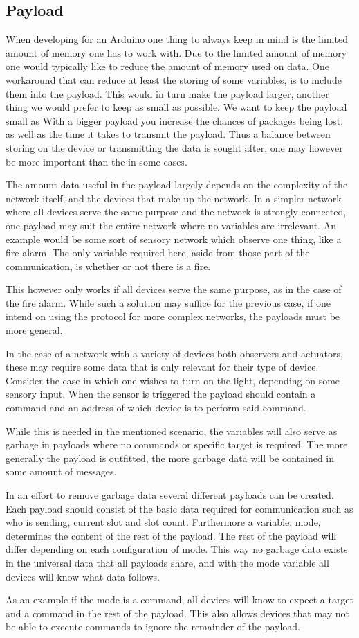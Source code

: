 \subsection{Payload}
When developing for an Arduino one thing to always keep in mind is the limited amount of memory one has to work with.
Due to the limited amount of memory one would typically like to reduce the amount of memory used on data.
One workaround that can reduce at least the storing of some variables, is to include them into the payload.
This would in turn make the payload larger, another thing we would prefer to keep as small as possible.
We want to keep the payload small as With a bigger payload you increase the chances of packages being lost, as well as the time it takes to transmit the payload. 
Thus a balance between storing on the device or transmitting the data is sought after, one may however be more important than the in some cases.

\bigskip \noindent
The amount data useful in the payload largely depends on the complexity of the network itself, and the devices that make up the network.
In a simpler network where all devices serve the same purpose and the network is strongly connected, one payload may suit the entire network where no variables are irrelevant.
An example would be some sort of sensory network which observe one thing, like a fire alarm.
The only variable required here, aside from those part of the communication, is whether or not there is a fire.

This however only works if all devices serve the same purpose, as in the case of the fire alarm.
While such a solution may suffice for the previous case, if one intend on using the protocol for more complex networks, the payloads must be more general.

\bigskip \noindent
In the case of a network with a variety of devices both observers and actuators, these may require some data that is only relevant for their type of device.
Consider the case in which one wishes to turn on the light, depending on some sensory input.
When the sensor is triggered the payload should contain a command and an address of which device is to perform said command.

While this is needed in the mentioned scenario, the variables will also serve as garbage in payloads where no commands or specific target is required.
The more generally the payload is outfitted, the more garbage data will be contained in some amount of messages.

\bigskip \noindent
In an effort to remove garbage data several different payloads can be created.
Each payload should consist of the basic data required for communication such as who is sending, current slot and slot count.
Furthermore a variable, mode, determines the content of the rest of the payload.
The rest of the payload will differ depending on each configuration of mode.
This way no garbage data exists in the universal data that all payloads share, and with the mode variable all devices will know what data follows.

As an example if the mode is a command, all devices will know to expect a target and a command in the rest of the payload.
This also allows devices that may not be able to execute commands to ignore the remainder of the payload.